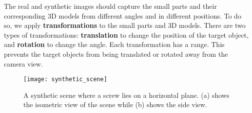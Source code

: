 The real and synthetic images should capture the small parts and their corresponding 3D models from different angles and in different positions. To do so, we apply \textbf{transformations} to the small parts and 3D models. There are two types of transformations: \textbf{translation} to change the position of the target object, and \textbf{rotation} to change the angle. Each transformation has a range. This prevents the target objects from being translated or rotated away from the camera view.

\begin{figure}[h]
\centering
  \texttt{[image: synthetic\_scene]}
\caption{A synthetic scene where a screw lies on a horizontal plane. (a) shows the isometric view of the scene while (b) shows the side view.}
\label{fig:synthetic_scene}
\end{figure}
